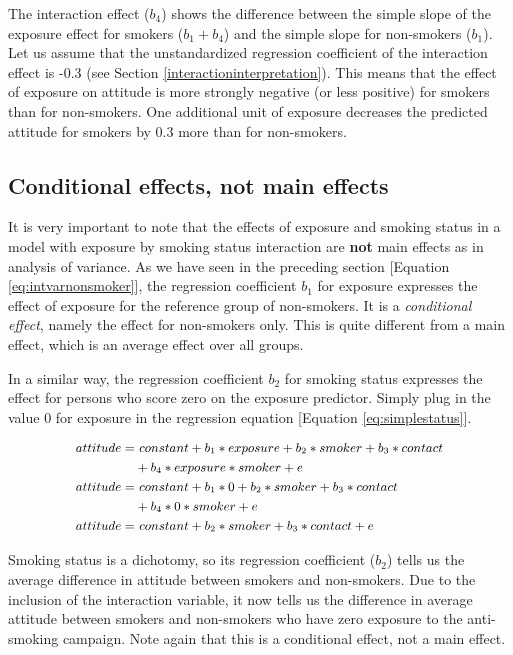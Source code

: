 \documentclass[a4paper]{book}
\theoremstyle{definition}
\theoremstyle{definition}
\theoremstyle{definition}
\theoremstyle{remark}
\begin{document}
The interaction effect (\(b_4\)) shows the difference between the simple
slope of the exposure effect for smokers (\(b_1+b_4\)) and the simple
slope for non-smokers (\(b_1\)). Let us assume that the unstandardized
regression coefficient of the interaction effect is -0.3 (see Section
\ref{interactioninterpretation}). This means that the effect of exposure
on attitude is more strongly negative (or less positive) for smokers
than for non-smokers. One additional unit of exposure decreases the
predicted attitude for smokers by 0.3 more than for non-smokers.

\subsection{Conditional effects, not main
effects}\label{conditional-effects}

It is very important to note that the effects of exposure and smoking
status in a model with exposure by smoking status interaction are
\textbf{not} main effects as in analysis of variance. As we have seen in
the preceding section {[}Equation \eqref{eq:intvarnonsmoker}{]}, the
regression coefficient \(b_1\) for exposure expresses the effect of
exposure for the reference group of non-smokers. It is a
\emph{conditional effect}, namely the effect for non-smokers only. This
is quite different from a main effect, which is an average effect over
all groups.

In a similar way, the regression coefficient \(b_2\) for smoking status
expresses the effect for persons who score zero on the exposure
predictor. Simply plug in the value 0 for exposure in the regression
equation {[}Equation \eqref{eq:simplestatus}{]}.

\begin{equation}
\small
\begin{split}
  attitude = &\ constant + b_1*exposure + b_2*smoker + b_3*contact\\
    &+ b_4*exposure*smoker + e \\
  attitude = &\ constant + b_1*0 + b_2*smoker + b_3*contact\\
    &+ b_4*0*smoker + e \\
  attitude = &\ constant + b_2*smoker + b_3*contact + e
\end{split}
\label{eq:simplestatus} 
\normalsize
\end{equation}

Smoking status is a dichotomy, so its regression coefficient (\(b_2\))
tells us the average difference in attitude between smokers and
non-smokers. Due to the inclusion of the interaction variable, it now
tells us the difference in average attitude between smokers and
non-smokers who have zero exposure to the anti-smoking campaign. Note
again that this is a conditional effect, not a main effect.
\end{document}
